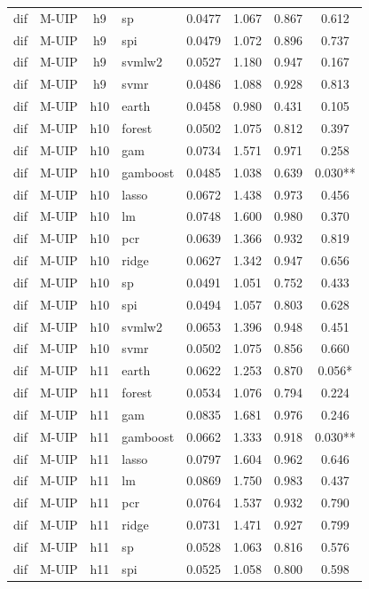 \begin{ThreePartTable}
\begin{longtable}[t]{llclcccc}
dif & M-UIP & h9 & sp & 0.0477 & 1.067 & 0.867 & 0.612\\
dif & M-UIP & h9 & spi & 0.0479 & 1.072 & 0.896 & 0.737\\
dif & M-UIP & h9 & svmlw2 & 0.0527 & 1.180 & 0.947 & 0.167\\
dif & M-UIP & h9 & svmr & 0.0486 & 1.088 & 0.928 & 0.813\\
\addlinespace
dif & M-UIP & h10 & earth & 0.0458 & 0.980 & 0.431 & 0.105\\
dif & M-UIP & h10 & forest & 0.0502 & 1.075 & 0.812 & 0.397\\
dif & M-UIP & h10 & gam & 0.0734 & 1.571 & 0.971 & 0.258\\
dif & M-UIP & h10 & gamboost & 0.0485 & 1.038 & 0.639 & 0.030**\\
dif & M-UIP & h10 & lasso & 0.0672 & 1.438 & 0.973 & 0.456\\
dif & M-UIP & h10 & lm & 0.0748 & 1.600 & 0.980 & 0.370\\
dif & M-UIP & h10 & pcr & 0.0639 & 1.366 & 0.932 & 0.819\\
dif & M-UIP & h10 & ridge & 0.0627 & 1.342 & 0.947 & 0.656\\
dif & M-UIP & h10 & sp & 0.0491 & 1.051 & 0.752 & 0.433\\
dif & M-UIP & h10 & spi & 0.0494 & 1.057 & 0.803 & 0.628\\
dif & M-UIP & h10 & svmlw2 & 0.0653 & 1.396 & 0.948 & 0.451\\
dif & M-UIP & h10 & svmr & 0.0502 & 1.075 & 0.856 & 0.660\\
\addlinespace
dif & M-UIP & h11 & earth & 0.0622 & 1.253 & 0.870 & 0.056*\\
dif & M-UIP & h11 & forest & 0.0534 & 1.076 & 0.794 & 0.224\\
dif & M-UIP & h11 & gam & 0.0835 & 1.681 & 0.976 & 0.246\\
dif & M-UIP & h11 & gamboost & 0.0662 & 1.333 & 0.918 & 0.030**\\
dif & M-UIP & h11 & lasso & 0.0797 & 1.604 & 0.962 & 0.646\\
dif & M-UIP & h11 & lm & 0.0869 & 1.750 & 0.983 & 0.437\\
dif & M-UIP & h11 & pcr & 0.0764 & 1.537 & 0.932 & 0.790\\
dif & M-UIP & h11 & ridge & 0.0731 & 1.471 & 0.927 & 0.799\\
dif & M-UIP & h11 & sp & 0.0528 & 1.063 & 0.816 & 0.576\\
dif & M-UIP & h11 & spi & 0.0525 & 1.058 & 0.800 & 0.598\\

\end{longtable}
\end{ThreePartTable}

